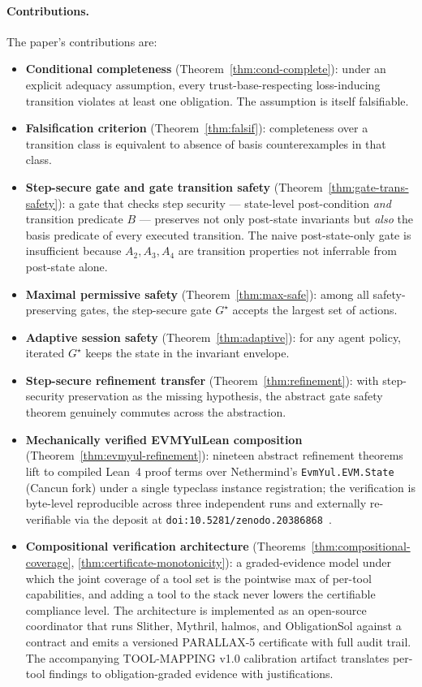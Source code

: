 \documentclass[11pt,a4paper]{article}
\begin{document}
\paragraph{Contributions.} The paper's contributions are:
\begin{itemize}
  \item \textbf{Conditional completeness} (Theorem~\ref{thm:cond-complete}): under an explicit adequacy assumption, every trust-base-respecting loss-inducing transition violates at least one obligation. The assumption is itself falsifiable.
  \item \textbf{Falsification criterion} (Theorem~\ref{thm:falsif}): completeness over a transition class is equivalent to absence of basis counterexamples in that class.
  \item \textbf{Step-secure gate and gate transition safety} (Theorem~\ref{thm:gate-trans-safety}): a gate that checks step security — state-level post-condition \emph{and} transition predicate $B$ — preserves not only post-state invariants but \emph{also} the basis predicate of every executed transition. The naive post-state-only gate is insufficient because $A_2, A_3, A_4$ are transition properties not inferrable from post-state alone.
  \item \textbf{Maximal permissive safety} (Theorem~\ref{thm:max-safe}): among all safety-preserving gates, the step-secure gate $G^\star$ accepts the largest set of actions.
  \item \textbf{Adaptive session safety} (Theorem~\ref{thm:adaptive}): for any agent policy, iterated $G^\star$ keeps the state in the invariant envelope.
  \item \textbf{Step-secure refinement transfer} (Theorem~\ref{thm:refinement}): with step-security preservation as the missing hypothesis, the abstract gate safety theorem genuinely commutes across the abstraction.
  \item \textbf{Mechanically verified EVMYulLean composition} (Theorem~\ref{thm:evmyul-refinement}): nineteen abstract refinement theorems lift to compiled Lean~4 proof terms over Nethermind's \texttt{EvmYul.EVM.State} (Cancun fork) under a single typeclass instance registration; the verification is byte-level reproducible across three independent runs and externally re-verifiable via the deposit at \texttt{doi:10.5281/zenodo.20386868}~\cite{duncan2026parallax5verification}.
  \item \textbf{Compositional verification architecture} (Theorems~\ref{thm:compositional-coverage}, \ref{thm:certificate-monotonicity}): a graded-evidence model under which the joint coverage of a tool set is the pointwise max of per-tool capabilities, and adding a tool to the stack never lowers the certifiable compliance level. The architecture is implemented as an open-source coordinator that runs Slither, Mythril, halmos, and ObligationSol against a contract and emits a versioned PARALLAX-5 certificate with full audit trail. The accompanying TOOL-MAPPING v1.0 calibration artifact translates per-tool findings to obligation-graded evidence with justifications.

\end{itemize}
\end{document}
